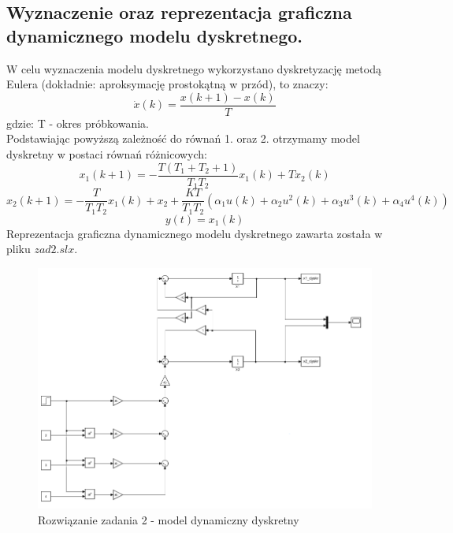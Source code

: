 \subsection{Wyznaczenie oraz reprezentacja graficzna dynamicznego modelu dyskretnego.}
W celu wyznaczenia modelu dyskretnego wykorzystano dyskretyzację metodą Eulera (dokładnie: aproksymację prostokątną w przód), to znaczy:
\begin{equation}
\dot{x}(k) = \frac{x(k+1)-x(k)}{T}
\end{equation}
gdzie: T - okres próbkowania. \\
Podstawiając powyższą zależność do równań 1. oraz 2. otrzymamy model dyskretny w postaci równań różnicowych:
\begin{equation}
x_{1}(k+1)= -\frac{T(T_{1}+T_{2}+1)}{T_{1}T_{2}}x_{1}(k) + Tx_{2}(k)
\end{equation}
\begin{equation}
x_{2}(k+1)= -\frac{T}{T_{1}T_{2}}x_{1}(k) + x_{2}+\frac{KT}{T_{1}T_{2}}(\alpha_{1}u(k) + \alpha_{2}u^2(k) + \alpha_{3}u^3(k) + \alpha_{4}u^4(k))
\end{equation}
\begin{equation}
y(t)=x_{1}(k)
\end{equation}
Reprezentacja graficzna dynamicznego modelu dyskretnego zawarta została w pliku $zad2.slx$.
\begin{figure}[H]
\centering
\includegraphics[width=15cm]{images/zad2.png}
\caption{Rozwiązanie zadania 2 - model dynamiczny dyskretny}
\label{fig:zad2}
\end{figure}
